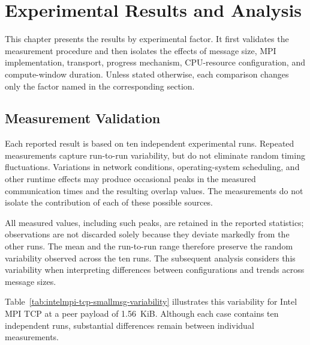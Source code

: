 
\chapter{Experimental Results and Analysis}\label{chapter:Experimental Results and Analysis}

This chapter presents the results by experimental factor. It first validates
the measurement procedure and then isolates the effects of message size, MPI
implementation, transport, progress mechanism, CPU-resource
configuration, and compute-window duration. Unless stated otherwise, each
comparison changes only the factor named in the corresponding section.

\section{Measurement Validation}

\label{sec:measurement-validation}

Each reported result is based on ten independent experimental runs.
Repeated measurements capture run-to-run variability, but do not eliminate
random timing fluctuations. Variations in network conditions, operating-system
scheduling, and other runtime effects may produce occasional peaks in the
measured communication times and the resulting overlap values. The measurements
do not isolate the contribution of each of these possible sources.

All measured values, including such peaks, are retained in the reported
statistics; observations are not discarded solely because they deviate markedly
from the other runs. The mean and the run-to-run range therefore preserve the
random variability observed across the ten runs. The subsequent analysis
considers this variability when interpreting differences between configurations
and trends across message sizes.

Table~\ref{tab:intelmpi-tcp-smallmsg-variability} illustrates this variability
for Intel MPI TCP at a peer payload of 1.56~KiB. Although each case contains
ten independent runs, substantial differences remain between individual
measurements.

